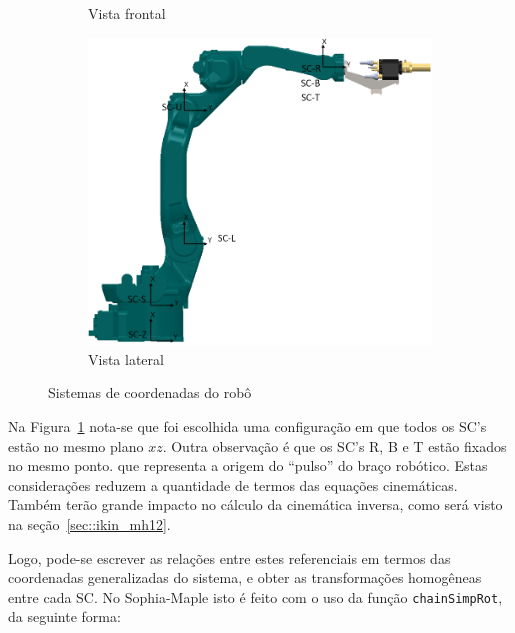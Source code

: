 \begin{figure}[h]
\begin{subfigure}[b]{0.20\textwidth}
        \caption{Vista frontal}
        \label{fig::sc_front}
    \end{subfigure}
    \quad %
    \begin{subfigure}[b]{0.7\textwidth}
        \includegraphics[width=\textwidth]{figs/sc_lat}
        \caption{Vista lateral}
        \label{fig::sc_lat}
    \end{subfigure}
    \caption{Sistemas de coordenadas do robô}\label{fig::scs}
\end{figure}

Na Figura~\ref{fig::sc_front} nota-se que foi escolhida uma configuração em que
todos os SC's estão no mesmo plano $xz$. Outra observação é que os SC's R,
B e T estão fixados no mesmo ponto. que representa a origem do ``pulso'' do
braço robótico. Estas considerações reduzem a quantidade de termos das equações
cinemáticas. Também terão grande impacto no cálculo da cinemática inversa, como
será visto na seção~\ref{sec::ikin_mh12}.

Logo, pode-se escrever as relações entre estes referenciais em termos das
coordenadas generalizadas do sistema, e obter as transformações homogêneas entre
cada SC. No Sophia-Maple isto é feito com o uso da função \texttt{chainSimpRot},
da seguinte forma:

\bigskip {} \bigskip 


